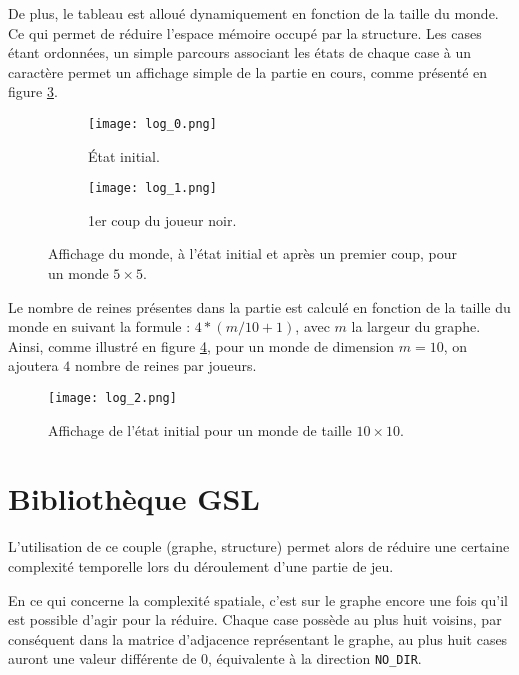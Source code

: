De plus, le tableau est alloué dynamiquement en fonction de la taille du monde. Ce qui permet de réduire l'espace mémoire occupé par la structure. Les cases étant ordonnées, un simple parcours associant les états de chaque case à un caractère permet un affichage simple de la partie en cours, comme présenté en figure \ref{fig:affichage_partie}. 

\medbreak

\begin{figure}[H]
    \centering
    \begin{subfigure}{0.4\textwidth}
        \centering
        \texttt{[image: log\_0.png]}
        \caption{État initial.}
        \label{subfig:affichage_etat_initial}
    \end{subfigure}
    \begin{subfigure}{0.52\textwidth}
        \centering
        \texttt{[image: log\_1.png]}
        \caption{1er coup du joueur noir.}
        \label{subfig:affichage_premier_coup}
    \end{subfigure}
    \caption{Affichage du monde, à l'état initial et après un premier coup, pour un monde $5\times5$.}
    \label{fig:affichage_partie}
\end{figure}

Le nombre de reines présentes dans la partie est calculé en fonction de la taille du monde en suivant la formule : $4*(m/10 + 1)$, avec $m$ la largeur du graphe. Ainsi, comme illustré en figure \ref{fig:affichage_taille_10}, pour un monde de dimension $m=10$, on ajoutera $4$ nombre de reines par joueurs.

\begin{figure}[H]
    \centering
    \texttt{[image: log\_2.png]}
    \caption{Affichage de l'état initial pour un monde de taille $10\times10$.}
    \label{fig:affichage_taille_10}
\end{figure}

\section{Bibliothèque GSL}
\label{sec:gsl}

L'utilisation de ce couple (graphe, structure) permet alors de réduire une certaine complexité temporelle lors du déroulement d'une partie de jeu. 

En ce qui concerne la complexité spatiale, c'est sur le graphe encore une fois qu'il est possible d'agir pour la réduire. Chaque case possède au plus huit voisins, par conséquent dans la matrice d'adjacence représentant le graphe, au plus huit cases auront une valeur différente de 0, équivalente à la direction \texttt{NO\_DIR}. 

